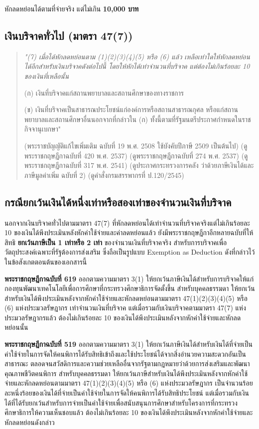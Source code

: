\documentclass[12pt,a4paper]{article}
\newcommand{\hilight}[1]{\textbf{#1}}
\begin{document}
หักลดหย่อนได้ตามที่จ่ายจริง แต่ไม่เกิน \hilight{10,000 บาท}

\subsection*{เงินบริจาคทั่วไป (มาตรา 47(7))}

\begin{quote}
{\itshape "(7) เมื่อได้หักลดหย่อนตาม (1)(2)(3)(4)(5) หรือ (6) แล้ว เหลือเท่าใดให้หักลดหย่อนได้อีกสำหรับเงินบริจาคดังต่อไปนี้ โดยให้หักได้เท่าจำนวนที่บริจาค แต่ต้องไม่เกินร้อยละ 10 ของเงินที่เหลือนั้น

(ก) เงินที่บริจาคแก่สถานพยาบาลและสถานศึกษาของทางราชการ

(ข) เงินที่บริจาคเป็นสาธารณประโยชน์แก่องค์การหรือสถานสาธารณกุศล หรือแก่สถานพยาบาลและสถานศึกษาอื่นนอกจากที่กล่าวใน (ก) ทั้งนี้ตามที่รัฐมนตรีประกาศกำหนดในราชกิจจานุเบกษา"} (พระราชบัญญัติแก้ไขเพิ่มเติม ฉบับที่ 19 พ.ศ. 2508 ใช้บังคับปีภาษี 2509 เป็นต้นไป) (ดูพระราชกฤษฎีกาฉบับที่ 420 พ.ศ. 2537) (ดูพระราชกฤษฎีกาฉบับที่ 274 พ.ศ. 2537) (ดูพระราชกฤษฎีกาฉบับที่ 317 พ.ศ. 2541) (ดูประกาศกระทรวงการคลัง ว่าด้วยภาษีเงินได้และภาษีมูลค่าเพิ่ม ฉบับที่ 2) (ดูคำสั่งกรมสรรพากรที่ ป.120/2545)
\end{quote}

\subsection*{กรณียกเว้นเงินได้หนึ่งเท่าหรือสองเท่าของจำนวนเงินที่บริจาค}

นอกจากเงินบริจาคทั่วไปตามมาตรา 47(7) ที่หักลดหย่อนได้เท่าจำนวนที่บริจาคจริงแต่ไม่เกินร้อยละ 10 ของเงินได้พึงประเมินหลังหักค่าใช้จ่ายและค่าลดหย่อนแล้ว ยังมีพระราชกฤษฎีกาอีกหลายฉบับที่ให้สิทธิ \hilight{ยกเว้นภาษีเป็น 1 เท่าหรือ 2 เท่า} ของจำนวนเงินที่บริจาคจริง สำหรับการบริจาคเพื่อวัตถุประสงค์เฉพาะที่รัฐต้องการส่งเสริม ซึ่งถือเป็นรูปแบบ Exemption as Deduction ดังที่กล่าวไว้ในข้อสังเกตตอนต้นของเอกสารนี้

\textbf{พระราชกฤษฎีกาฉบับที่ 619} ออกตามความมาตรา 3(1) ให้ยกเว้นภาษีเงินได้สำหรับการบริจาคให้แก่กองทุนพัฒนาเทคโนโลยีเพื่อการศึกษาที่กระทรวงศึกษาธิการจัดตั้งขึ้น สำหรับบุคคลธรรมดา ให้ยกเว้นสำหรับเงินได้พึงประเมินหลังจากหักค่าใช้จ่ายและหักลดหย่อนตามมาตรา 47(1)(2)(3)(4)(5) หรือ (6) แห่งประมวลรัษฎากร เท่าจำนวนเงินที่บริจาค แต่เมื่อรวมกับเงินบริจาคตามมาตรา 47(7) แห่งประมวลรัษฎากรแล้ว ต้องไม่เกินร้อยละ 10 ของเงินได้พึงประเมินหลังจากหักค่าใช้จ่ายและหักลดหย่อนนั้น

\textbf{พระราชกฤษฎีกาฉบับที่ 519} ออกตามความมาตรา 3(1) ให้ยกเว้นภาษีเงินได้สำหรับเงินได้ที่จ่ายเป็นค่าใช้จ่ายในการจัดให้คนพิการได้รับสิทธิเข้าถึงและใช้ประโยชน์ได้จากสิ่งอำนวยความสะดวกอันเป็นสาธารณะ ตลอดจนสวัสดิการและความช่วยเหลืออื่นจากรัฐตามกฎหมายว่าด้วยการส่งเสริมและพัฒนาคุณภาพชีวิตคนพิการ สำหรับบุคคลธรรมดา ให้ยกเว้นภาษีสำหรับเงินได้พึงประเมินหลังจากหักค่าใช้จ่ายและหักลดหย่อนตามมาตรา 47(1)(2)(3)(4)(5) หรือ (6) แห่งประมวลรัษฎากร เป็นจำนวนร้อยละหนึ่งร้อยของเงินได้ที่จ่ายเป็นค่าใช้จ่ายในการจัดให้คนพิการได้รับสิทธิประโยชน์ แต่เมื่อรวมกับเงินได้ที่ได้รับยกเว้นสำหรับการจ่ายเป็นค่าใช้จ่ายเพื่อสนับสนุนการศึกษาสำหรับโครงการที่กระทรวงศึกษาธิการให้ความเห็นชอบแล้ว ต้องไม่เกินร้อยละ 10 ของเงินได้พึงประเมินหลังจากหักค่าใช้จ่ายและหักลดหย่อนดังกล่าว
\end{document}
